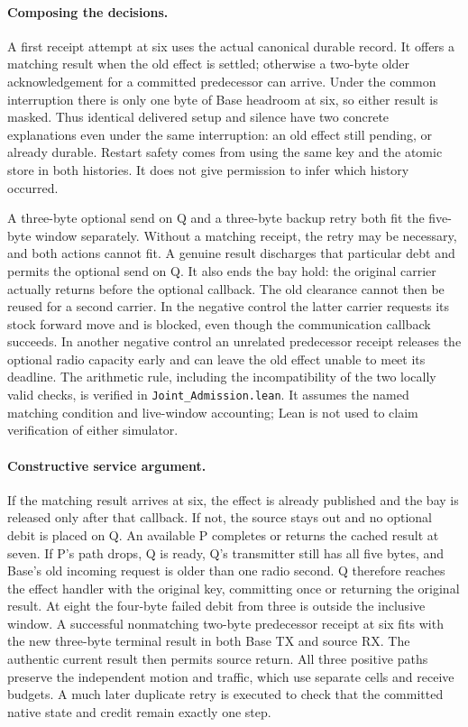 \documentclass{article}
\begin{document}
\paragraph{Composing the decisions.}
A first receipt attempt at six uses the actual canonical durable
record. It offers a matching result when the old effect is
settled; otherwise a two-byte older acknowledgement for a committed
predecessor can arrive. Under the common interruption there is
only one byte of Base headroom at six, so either result is masked.
Thus identical delivered setup and silence have two concrete
explanations even under the same interruption: an old effect
still pending, or already durable. Restart safety comes from using
the same key and the atomic store in both histories. It does not
give permission to infer which history occurred.

A three-byte optional send on Q and a three-byte backup retry both
fit the five-byte window separately. Without a matching receipt,
the retry may be necessary, and both actions cannot fit. A genuine
result discharges that particular debt and permits the optional
send on Q. It also ends the bay hold: the original carrier actually
returns before the optional callback. The old clearance cannot then
be reused for a second carrier. In the negative control the latter
carrier requests its stock forward move and is blocked, even though
the communication callback succeeds. In another negative control
an unrelated predecessor receipt releases the optional radio
capacity early and can leave the old effect unable to meet its
deadline. The arithmetic rule, including the incompatibility of
the two locally valid checks, is verified in \verb|Joint_Admission.lean|.
It assumes the named matching condition and live-window accounting;
Lean is not used to claim verification of either simulator.

\paragraph{Constructive service argument.}
If the matching result arrives at six, the effect is already
published and the bay is released only after that callback. If
not, the source stays out and no optional debit is placed on Q.
An available P completes or returns the cached result at seven.
If P's path drops, Q is ready, Q's transmitter still has all five
bytes, and Base's old incoming request is older than one radio
second. Q therefore reaches the effect handler with the original
key, committing once or returning the original result. At eight
the four-byte failed debit from three is outside the inclusive
window. A successful nonmatching two-byte predecessor receipt
at six fits with the new three-byte terminal result in both
Base TX and source RX. The authentic current result then permits
source return. All three positive paths preserve the independent
motion and traffic, which use separate cells and receive budgets.
A much later duplicate retry is executed to check that the
committed native state and credit remain exactly one step.
\end{document}
